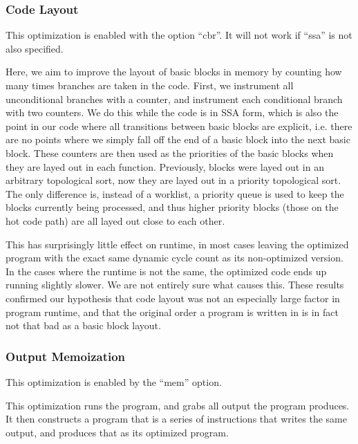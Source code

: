 \documentclass[12pt,letterpaper]{article}
\begin{document}
\subsubsection*{Code Layout}

This optimization is enabled with the option ``cbr''. It will not work
if ``ssa'' is not also specified.

Here, we aim to improve the layout of basic blocks in memory by
counting how many times branches are taken in the code. First, we
instrument all unconditional branches with a counter, and instrument
each conditional branch with two counters. We do this while the code
is in SSA form, which is also the point in our code where all
transitions between basic blocks are explicit, i.e. there are no
points where we simply fall off the end of a basic block into the next
basic block. These counters are then used as the priorities of the
basic blocks when they are layed out in each function. Previously,
blocks were layed out in an arbitrary topological sort, now they are
layed out in a priority topological sort. The only difference is,
instead of a worklist, a priority queue is used to keep the blocks
currently being processed, and thus higher priority blocks (those on
the hot code path) are all layed out close to each other.

This has surprisingly little effect on runtime, in most cases leaving
the optimized program with the exact same dynamic cycle count as its
non-optimized version. In the cases where the runtime is not the same,
the optimized code ends up running slightly slower. We are not
entirely sure what causes this. These results confirmed our hypothesis
that code layout was not an especially large factor in program
runtime, and that the original order a program is written in is in
fact not that bad as a basic block layout.


\subsubsection*{Output Memoization}

This optimization is enabled by the ``mem'' option.

This optimization runs the program, and grabs all output the program
produces. It then constructs a program that is a series of
instructions that writes the same output, and produces that as its
optimized program.
\end{document}
